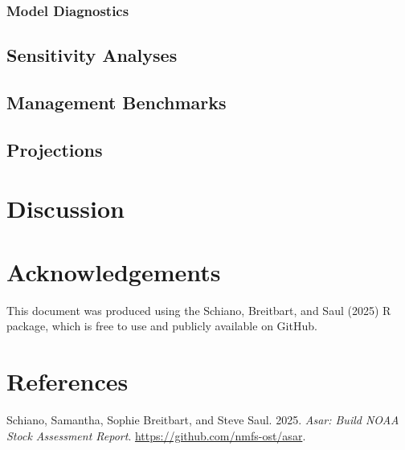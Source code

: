 \documentclass[
]{scrartcl}
\newlength{\cslhangindent}
\newenvironment{CSLReferences}[2] %
 {\begin{list}{}{%
  \setlength{\itemindent}{0pt}
  \setlength{\leftmargin}{0pt}
  \setlength{\parsep}{0pt}
  \ifodd #1
   \setlength{\leftmargin}{\cslhangindent}
   \setlength{\itemindent}{-1\cslhangindent}
  \fi
  \setlength{\itemsep}{#2\baselineskip}}}
 {\end{list}}
\begin{document}
\subsubsection{Model Diagnostics}\label{model-diagnostics}

\newpage{}

\subsection{Sensitivity Analyses}\label{sec-assmt-sens}

\newpage{}

\subsection{Management Benchmarks}\label{sec-assmt-bench}

\newpage{}

\subsection{Projections}\label{sec-assmt-proj}

\newpage{}

\section{Discussion}\label{sec-discussion}

\newpage{}

\section{Acknowledgements}\label{sec-acknowledgements}

This document was produced using the Schiano, Breitbart, and Saul (2025)
R package, which is free to use and publicly available on GitHub.

\newpage{}

\section{References}\label{sec-refs}

\label{refs}
\begin{CSLReferences}{1}{0}
Schiano, Samantha, Sophie Breitbart, and Steve Saul. 2025. \emph{Asar:
Build NOAA Stock Assessment Report}.
\url{https://github.com/nmfs-ost/asar}.

\end{CSLReferences}
\end{document}
